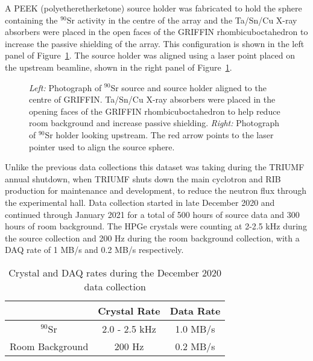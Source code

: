 \documentclass[cnatzke_thesis_proposal.tex]{subfiles}
\begin{document}
A PEEK (polyetheretherketone) source holder was fabricated to hold the sphere containing the $^{90}$Sr activity in the centre of the array and the Ta/Sn/Cu X-ray absorbers were placed in the open faces of the GRIFFIN rhombicuboctahedron to increase the passive shielding of the array. This configuration is shown in the left panel of Figure~\ref{fig:source_holder_in_griffin}. The source holder was aligned using a laser point placed on the upstream beamline, shown in the right panel of Figure~\ref{fig:source_holder_in_griffin}.

\begin{figure}[htbp]
  \centering
  \qquad
  \caption{
    \textit{Left:} Photograph of $^{90}$Sr source and source holder aligned to the centre of GRIFFIN. Ta/Sn/Cu X-ray absorbers were placed in the opening faces of the GRIFFIN rhombicuboctahedron to help reduce room background and increase passive shielding.
    \textit{Right:} Photograph of $^{90}$Sr holder looking upstream. The red arrow points to the laser pointer used to align the source sphere.
  }
  \label{fig:source_holder_in_griffin}
\end{figure}

Unlike the previous data collections this dataset was taking during the TRIUMF annual shutdown, when TRIUMF shuts down the main cyclotron and RIB production for maintenance and development, to reduce the neutron flux through the experimental hall. Data collection started in late December 2020 and continued through January 2021 for a total of 500 hours of source data and 300 hours of room background. The HPGe crystals were counting at 2-2.5 kHz during the source collection and 200 Hz during the room background collection, with a DAQ rate of 1 MB/s and 0.2 MB/s respectively.

\begin{table}[]
  \centering
  \begin{tabular}{ccc}
                  & \textbf{Crystal Rate} & \textbf{Data Rate} \\ \hline
  $^{90}$Sr       & 2.0 - 2.5 kHz         & 1.0 MB/s           \\
  Room Background & 200 Hz                & 0.2 MB/s          
  \end{tabular}
  \caption{Crystal and DAQ rates during the December 2020 data collection}
  \label{tab:dec2020_rates}
\end{table}
\end{document}
